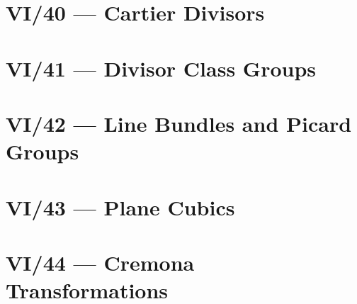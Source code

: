 


\section{VI/40 --- Cartier Divisors}






\section{VI/41 --- Divisor Class Groups}






\section{VI/42 --- Line Bundles and Picard Groups}






\section{VI/43 --- Plane Cubics}






\section{VI/44 --- Cremona Transformations}

